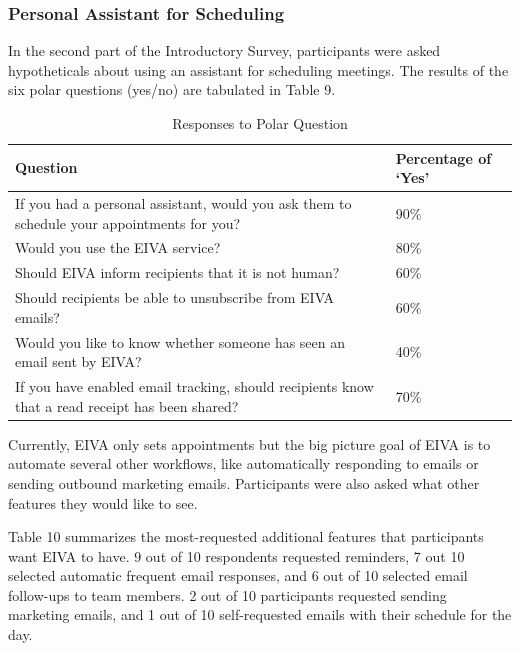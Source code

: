 \documentclass{article}
\begin{document}
\subsubsection{Personal Assistant for Scheduling}

In the second part of the Introductory Survey, participants were asked hypotheticals about using an assistant for scheduling meetings. The results of the six polar questions (yes/no) are tabulated in Table 9.

\begin{table}[!htb]
    \begin{minipage}{1\linewidth}
   	 \caption{Responses to Polar Question}
      \centering
        \begin{tabular}{p{10cm}p{2cm}}
	        \hline
            \textbf{Question} & \textbf{Percentage of `Yes'} \\
            \hline
            If you had a personal assistant, would you ask them to schedule your appointments for you? & 90\% \\
            Would you use the EIVA service? & 80\% \\
            Should EIVA inform recipients that it is not human? & 60\% \\
            Should recipients be able to unsubscribe from EIVA emails? & 60\% \\
            Would you like to know whether someone has seen an email sent by EIVA? & 40\% \\
            If you have enabled email tracking, should recipients know that a read receipt has been shared? & 70\% \\
            \hline
        \end{tabular}
    \end{minipage}%
\end{table}

Currently, EIVA only sets appointments but the big picture goal of EIVA is to automate several other workflows, like automatically responding to emails or sending outbound marketing emails. Participants were also asked what other features they would like to see.

Table 10 summarizes the most-requested additional features that participants want EIVA to have. 9 out of 10 respondents requested reminders, 7 out 10 selected automatic frequent email responses, and 6 out of 10 selected email follow-ups to team members. 2 out of 10 participants requested sending marketing emails, and 1 out of 10 self-requested emails with their schedule for the day.
\end{document}
